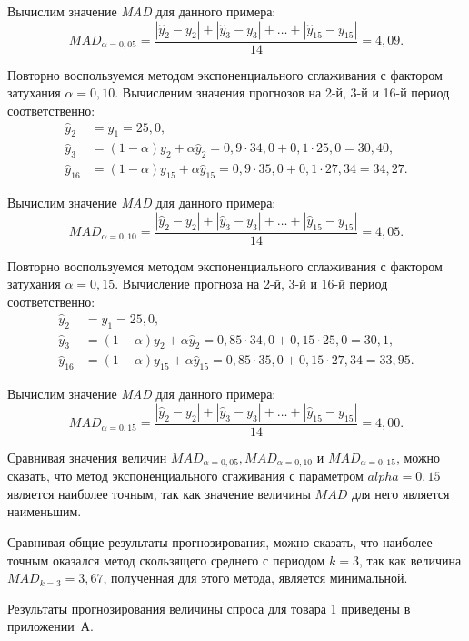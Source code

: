 Вычислим значение \textit{MAD} для данного примера:
\[
  MAD_{\alpha = 0{,}05} = \dfrac{|\hat{y}_2 - y_2| + |\hat{y}_3 - y_3| + \dots + |\hat{y}_{15} - y_{15}|}{14} = 4{,}09.
\]

Повторно воспользуемся методом экспоненциального сглаживания с фактором
затухания $\alpha=0{,}10$. Вычисленим значения прогнозов на 2-й, 3-й и 16-й период соответственно:
\begin{align*}
  \hat{y}_2 &= y_1 = 25{,}0, \\
  \hat{y}_3 &= (1 - \alpha) y_2 + \alpha \hat{y}_2 = 0{,}9 \cdot 34{,}0 + 0{,}1 \cdot 25{,}0 = 30{,}40, \\
  \hat{y}_{16} &= (1 - \alpha) y_{15} + \alpha \hat{y}_{15}  = 0{,}9 \cdot 35{,}0 + 0{,}1 \cdot 27{,}34 = 34{,}27.
\end{align*}

Вычислим значение \textit{MAD} для данного примера:
\[
  MAD_{\alpha = 0{,}10} = \dfrac{|\hat{y}_2 - y_2| + |\hat{y}_3 - y_3| + \dots + |\hat{y}_{15} - y_{15}|}{14} = 4{,}05.
\]

Повторно воспользуемся методом экспоненциального сглаживания с фактором
затухания $\alpha=0{,}15$. Вычисление прогноза на 2-й, 3-й и 16-й период соответственно:
\begin{align*}
  \hat{y}_2 &= y_1 = 25{,}0, \\
  \hat{y}_3 &= (1 - \alpha) y_2 + \alpha \hat{y}_2 = 0{,}85 \cdot 34{,}0 + 0{,}15 \cdot 25{,}0 = 30{,}1, \\
  \hat{y}_{16} &= (1 - \alpha) y_{15} + \alpha \hat{y}_{15}  = 0{,}85 \cdot 35{,}0 + 0{,}15 \cdot 27{,}34 = 33{,}95.
\end{align*}

Вычислим значение \textit{MAD} для данного примера:
\[
  MAD_{\alpha = 0{,}15} = \dfrac{|\hat{y}_2 - y_2| + |\hat{y}_3 - y_3| + \dots + |\hat{y}_{15} - y_{15}|}{14} = 4{,}00.
\]

Сравнивая значения величин $MAD_{\alpha = 0{,}05}, MAD_{\alpha = 0{,}10}$ и $MAD_{\alpha = 0{,}15}$,
можно сказать, что метод экспоненциального сгаживания с параметром $alpha = 0{,}15$
является наиболее точным, так как значение величины $MAD$ для него является наименьшим.

Сравнивая общие результаты прогнозирования, можно сказать, что наиболее точным
оказался метод скользящего среднего с периодом $k = 3$, так как величина
$ MAD_{k=3} = 3{,}67$, полученная для этого метода, является минимальной.

Результаты прогнозирования величины спроса для товара 1 приведены в приложении~А.



